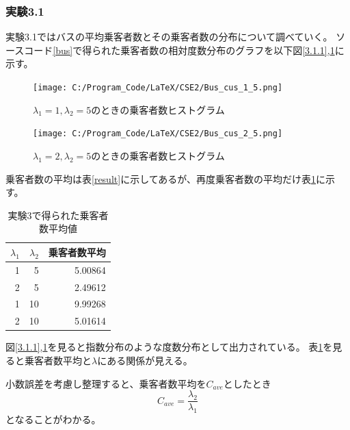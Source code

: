 \documentclass[a4paper,11pt,dvipdfmx]{jsarticle}
\begin{document}
\subsubsection{実験3.1}
実験3.1ではバスの平均乗客者数とその乗客者数の分布について調べていく。
ソースコード\ref{bus}で得られた乗客者数の相対度数分布のグラフを以下図\ref{3.1.1},\ref{3.1.2}に示す。
\begin{figure}[h]
    \begin{minipage}[b]{0.48\columnwidth}
      \centering
      \texttt{[image: C:/Program\_Code/LaTeX/CSE2/Bus\_cus\_1\_5.png]}
      \caption{$\lambda_1=1,\lambda_2=5$のときの乗客者数ヒストグラム}
      \label{3.1.1}
    \end{minipage}
    \hspace{0.04\columnwidth} 
    \begin{minipage}[b]{0.48\columnwidth}
      \centering
      \texttt{[image: C:/Program\_Code/LaTeX/CSE2/Bus\_cus\_2\_5.png]}
      \caption{$\lambda_1=2,\lambda_2=5$のときの乗客者数ヒストグラム}
      \label{3.1.2}
    \end{minipage}
\end{figure}

乗客者数の平均は表\ref{result}に示してあるが、再度乗客者数の平均だけ表\ref{result_1}に示す。
\begin{table}[h]
    \centering
    \caption{実験3で得られた乗客者数平均値}
    \begin{tabular}{|r|r|r|} \hline
        $\lambda_1$ & $\lambda_2$ & 乗客者数平均  \\ \hline
        1 & 5  & 5.00864 \\ \hline
        2 & 5  & 2.49612 \\ \hline
        1 & 10 & 9.99268 \\ \hline
        2 & 10 & 5.01614 \\ \hline
    \end{tabular}
    \label{result_1}
\end{table}

図\ref{3.1.1},\ref{3.1.2}を見ると指数分布のような度数分布として出力されている。
表\ref{result_1}を見ると乗客者数平均と$\lambda$にある関係が見える。

小数誤差を考慮し整理すると、乗客者数平均を$C_{ave}$としたとき
\begin{equation}
    C_{ave} = \frac{\lambda_2}{\lambda_1}
\end{equation}
となることがわかる。
\end{document}

